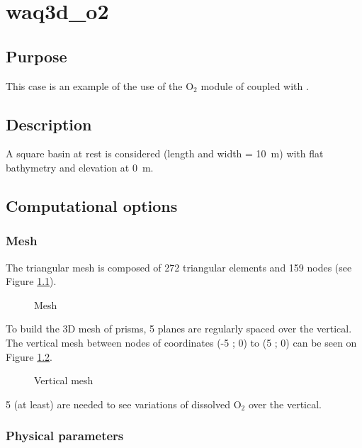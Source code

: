 \chapter{waq3d\_o2}

\section{Purpose}

This case is an example of the use of the O$_2$ module of \waqtel coupled with
.

\section{Description}

A square basin at rest is considered (length and width = 10~m)
with flat bathymetry and elevation at 0~m.

\section{Computational options}

\subsection{Mesh}

The triangular mesh is composed of 272 triangular elements and 159 nodes
(see Figure \ref{fig:waq3d_o2:mesh}).

\begin{figure}[H]
 \centering
\caption{Mesh}
 \label{fig:waq3d_o2:mesh}
\end{figure}

To build the 3D mesh of prisms, 5 planes are regularly spaced over the vertical.
The vertical mesh between nodes of coordinates (-5 ; 0) to (5 ; 0) can be
seen on Figure \ref{fig:waq3d_o2:mesh_section}.

\begin{figure}[H]
 \centering
\caption{Vertical mesh}
 \label{fig:waq3d_o2:mesh_section}
\end{figure}

5 (at least) are needed to see variations of dissolved O$_2$ over the vertical.

\subsection{Physical parameters}


